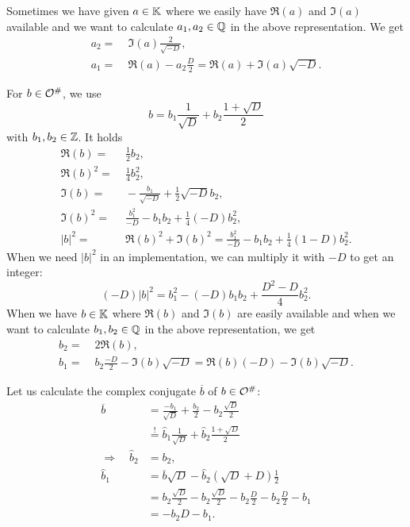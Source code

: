 Sometimes we have given $a \in \mathbb{K}$ where we easily have $\Re(a)$ and $\Im(a)$ available and we want to calculate $a_1, a_2 \in \mathbb{Q}$ in the above representation. We get
\begin{align*}
a_2 = &\; \Im(a) \frac{2}{\sqrt{-D}}, \\
a_1 = &\; \Re(a) - a_2 \frac{D}{2} = \Re(a) + \Im(a) \sqrt{-D} .
\end{align*}

\label{impl:repr:curlOdual}

For $b \in \mathcal{O}^\#$, we use
\[ b = b_1 \frac{1}{\sqrt{D}} + b_2 \frac{1 + \sqrt{D}} {2} \]
with $b_1,b_2 \in \mathbb{Z}$.
It holds
\begin{align*}
\Re(b) = &\; \frac{1}{2} b_2, \\
\Re(b)^2 = &\; \frac{1}{4} b_2^2, \\
\Im(b) = &\; -\frac{b_1}{\sqrt{-D}} + \frac{1}{2} \sqrt{-D} b_2, \\
\Im(b)^2 = &\; \frac{b_1^2}{-D} - b_1 b_2 + \frac{1}{4} (-D) b_2^2, \\
|b|^2 = &\; \Re(b)^2 + \Im(b)^2 = \frac{b_1^2}{-D} - b_1 b_2 + \frac{1}{4} (1-D) b_2^2 .
\end{align*}
When we need $|b|^2$ in an implementation, we can multiply it with $-D$ to get an integer:
\[ (-D) |b|^2 = b_1^2 - (-D) b_1 b_2 + \frac{D^2-D}{4} b_2^2 . \]
%
When we have $b \in \mathbb{K}$ where $\Re(b)$ and $\Im(b)$ are easily available and when we want to calculate $b_1,b_2 \in \mathbb{Q}$ in the above representation, we get
\begin{align*}
b_2 =&\; 2 \Re(b) , \\
b_1 =&\; b_2 \frac{-D}{2} - \Im(b) \sqrt{-D} = \Re(b) (-D) - \Im(b) \sqrt{-D} .
\end{align*}

Let us calculate the complex conjugate $\overline{b}$ of $b \in \mathcal{O}^\#$:
\begin{align*}
\overline{b} &= \frac{-b_1}{\sqrt{D}} + \frac{b_2}{2} - b_2 \frac{\sqrt{D}}{2} \\
&\overset{!}{=} \hat{b}_1 \frac{1}{\sqrt{D}} + \hat{b}_2 \frac{1 + \sqrt{D}} {2} \\
\Rightarrow \quad \hat{b}_2 &= b_2 , \\
\hat{b}_1 &= \overline{b} \sqrt{D} - \hat{b}_2 (\sqrt{D}+D) \tfrac{1}{2} \\
&= b_2 \frac{\sqrt{D}}{2} - b_2 \frac{\sqrt{D}}{2} - b_2 \frac{D}{2} - b_2 \frac{D}{2} - b_1 \\
&= -b_2 D - b_1 .
\end{align*}

